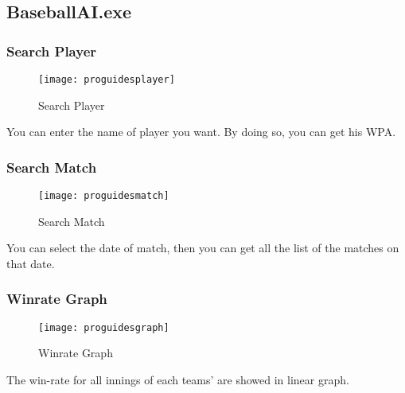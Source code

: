 \documentclass[conference,compsoc, twocolumn]{IEEEtran}
\begin{document}
\begin{itemize}
\subsection{BaseballAI.exe}
\subsubsection{Search Player}
\begin{figure}[H]
\centering\texttt{[image: proguidesplayer]}
\caption{Search Player}
\end{figure}
You can enter the name of player you want. By doing so, you can get his WPA.

\subsubsection{Search Match}
\begin{figure}[H]
\centering\texttt{[image: proguidesmatch]}
\caption{Search Match}
\end{figure}
You can select the date of match, then you can get all the list of the matches on that date.

\subsubsection{Winrate Graph}
\begin{figure}[H]
\centering\texttt{[image: proguidesgraph]}
\caption{Winrate Graph}
\end{figure}
The win-rate for all innings of each teams’ are showed in linear graph.



\end{itemize}
\end{document}
